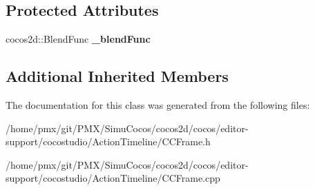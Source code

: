 \subsection*{Protected Attributes}
\begin{DoxyCompactItemize}
\item 
\mbox{\label{classBlendFuncFrame_a3e68d70e41912bbe86757f59cd2fb2dd}} 
cocos2d\+::\+Blend\+Func {\bfseries \+\_\+blend\+Func}
\end{DoxyCompactItemize}
\subsection*{Additional Inherited Members}


The documentation for this class was generated from the following files\+:\begin{DoxyCompactItemize}
\item 
/home/pmx/git/\+P\+M\+X/\+Simu\+Cocos/cocos2d/cocos/editor-\/support/cocostudio/\+Action\+Timeline/C\+C\+Frame.\+h\item 
/home/pmx/git/\+P\+M\+X/\+Simu\+Cocos/cocos2d/cocos/editor-\/support/cocostudio/\+Action\+Timeline/C\+C\+Frame.\+cpp\end{DoxyCompactItemize}
